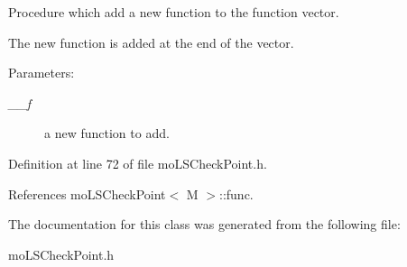 Procedure which add a new function to the function vector. 

The new function is added at the end of the vector. \begin{Desc}
\item[Parameters:]
\begin{description}
\item[{\em \_\-\_\-f}]a new function to add. \end{description}
\end{Desc}


Definition at line 72 of file moLSCheckPoint.h.

References moLSCheckPoint$<$ M $>$::func.

The documentation for this class was generated from the following file:\begin{CompactItemize}
\item 
moLSCheckPoint.h\end{CompactItemize}
